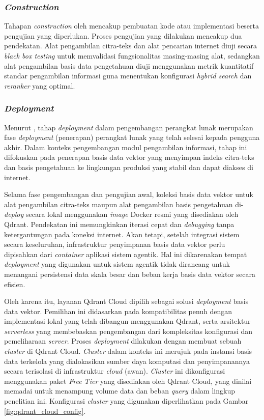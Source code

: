 \subsubsection{\textit{Construction}}
Tahapan \textit{construction} oleh \textcite{pressmanSoftwareEngineeringPractitioners2020} mencakup pembuatan kode atau implementasi beserta pengujian yang diperlukan. Proses pengujian yang dilakukan mencakup dua pendekatan. Alat pengambilan citra-teks dan alat pencarian internet diuji secara \textit{black box testing} untuk memvalidasi fungsionalitas masing-masing alat, sedangkan alat pengambilan basis data pengetahuan diuji menggunakan metrik kuantitatif standar pengambilan informasi guna menentukan konfigurasi \textit{hybrid search} dan \textit{reranker} yang optimal.

\subsubsection{\textit{Deployment}}
Menurut \textcite{pressmanSoftwareEngineeringPractitioners2020}, tahap \textit{deployment} dalam pengembangan perangkat lunak merupakan fase \textit{deployment} (penerapan) perangkat lunak yang telah selesai kepada pengguna akhir. Dalam konteks pengembangan modul pengambilan informasi, tahap ini difokuskan pada penerapan basis data vektor yang menyimpan indeks citra-teks dan basis pengetahuan ke lingkungan produksi yang stabil dan dapat diakses di internet.

Selama fase pengembangan dan pengujian awal, koleksi basis data vektor untuk alat pengambilan citra-teks maupun alat pengambilan basis pengetahuan di-\textit{deploy} secara lokal menggunakan \textit{image} Docker resmi yang disediakan oleh Qdrant. Pendekatan ini memungkinkan iterasi cepat dan \textit{debugging} tanpa ketergantungan pada koneksi internet. Akan tetapi, setelah integrasi sistem secara keseluruhan, infrastruktur penyimpanan basis data vektor perlu dipisahkan dari \textit{container} aplikasi sistem agentik. Hal ini dikarenakan tempat \textit{deployment} yang digunakan untuk sistem agentik tidak dirancang untuk menangani persistensi data skala besar dan beban kerja basis data vektor secara efisien.

Oleh karena itu, layanan Qdrant Cloud dipilih sebagai solusi \textit{deployment} basis data vektor. Pemilihan ini didasarkan pada kompatibilitas penuh dengan implementasi lokal yang telah dibangun menggunakan Qdrant, serta arsitektur \textit{serverless} yang membebaskan pengembangan dari kompleksitas konfigurasi dan pemeliharaan \textit{server}. Proses \textit{deployment} dilakukan dengan membuat sebuah \textit{cluster} di Qdrant Cloud. \textit{Cluster} dalam konteks ini merujuk pada instansi basis data terkelola yang dialokasikan sumber daya komputasi dan penyimpanannya secara terisolasi di infrastruktur \textit{cloud} (awan). \textit{Cluster} ini dikonfigurasi menggunakan paket \textit{Free Tier} yang disediakan oleh Qdrant Cloud, yang dinilai memadai untuk menampung volume data dan beban \textit{query} dalam lingkup penelitian ini. Konfigurasi \textit{cluster} yang digunakan diperlihatkan pada Gambar \ref{fig:qdrant_cloud_config}.

